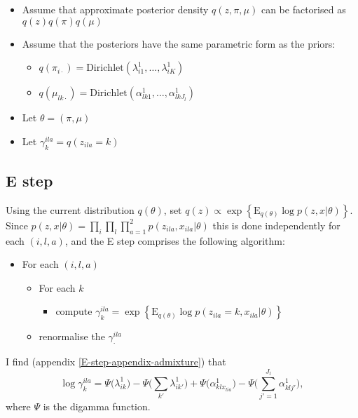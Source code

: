 \documentclass[12pt,a4paper,reqno]{article}
\newcommand{\E}{\text{E}{}}
\newcommand{\(}{\left(}
\newcommand{\)}{\right)}
\newcommand{\|}{\arrowvert}
\renewcommand{\digamma}{\Psi}
\begin{document}
\begin{itemize}
\item Assume that approximate posterior density $q(z,\pi,\mu)$ can be factorised as $q(z)q(\pi)q(\mu)$
\item Assume that the posteriors have the same parametric form as the priors:
  \begin{itemize}
  \item $q(\pi_{i\cdot}) = \text{Dirichlet}(\lambda^{1}_{i1},\ldots,\lambda^{1}_{iK})$
  \item $q(\mu_{lk\cdot})= \text{Dirichlet}(\alpha^{1}_{lk1},\ldots,\alpha^{1}_{lkJ_{l}})$
  \end{itemize}
\item Let $\theta = (\pi,\mu)$
\item Let $\gamma^{ila}_{k} = q(z_{ila}=k)$
\end{itemize}

\subsection{E step}
Using the current distribution $q(\theta)$, set $q(z) \propto \exp\left\{\E_{q(\theta)} \log p(z,x|\theta)\right\}$. Since $p(z,x|\theta) = \prod_{i} \prod_{l} \prod_{a=1}^{2}p(z_{ila},x_{ila}|\theta)$ this is done independently for each $(i,l,a)$, and the E step comprises the following algorithm:
\begin{itemize}
\item For each $(i,l,a)$
  \begin{itemize}
  \item For each $k$
    \begin{itemize}
    \item compute $\gamma^{ila}_{k} = \exp\left\{\E_{q(\theta)} \log p(z_{ila}=k,x_{ila}|\theta)\right\}$
    \end{itemize}
  \item renormalise the $\gamma^{ila}_{\cdot}$
  \end{itemize}
\end{itemize}
I find (appendix \ref{E-step-appendix-admixture}) that
\begin{equation*}
\log \gamma^{ila}_{k} = \digamma\Big(\lambda^{1}_{ik}\Big) - \digamma\Big(\sum_{k'}\lambda^{1}_{ik'}\Big) + \digamma\Big(\alpha^{1}_{klx_{lia}}\Big) - \digamma\Big(\sum_{j'=1}^{J_{l}}\alpha^{1}_{klj'}\Big),
\end{equation*}
where $\digamma$ is the digamma function.
\end{document}
